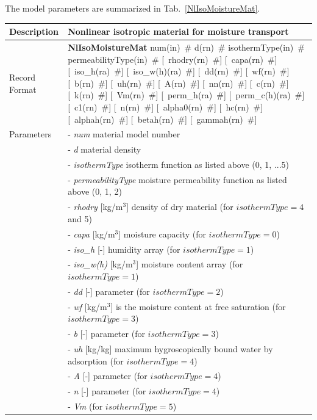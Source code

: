 \documentclass[a4paper]{article}
\newcommand{\descitem}[1]{{\noindent \bf #1}}
\newcommand{\elemparam}[2]{{{#1\tiny (#2)}~\#}}
\newcommand{\optelemparam}[2]{[{~\elemparam{#1}{#2}}]}
\newcommand{\param}[1]{{\it #1}}
\begin{document}
The model parameters are summarized in Tab.~\ref{NlIsoMoistureMat}.
\begin{table}[!htb]
\begin{tabular}{|l|p{9cm}|}
\hline
Description & Nonlinear isotropic material for moisture transport \\
\hline
Record Format & \descitem{NlIsoMoistureMat} \elemparam{num}{in}
\elemparam{d}{rn} \elemparam{isothermType}{in} \elemparam{permeabilityType}{in}
\optelemparam{rhodry}{rn} \optelemparam{capa}{rn}
\optelemparam{iso\_h}{ra} \optelemparam{iso\_w(h)}{ra}
\optelemparam{dd}{rn} \optelemparam{wf}{rn} \optelemparam{b}{rn}
\optelemparam{uh}{rn} \optelemparam{A}{rn} \optelemparam{nn}{rn}
\optelemparam{c}{rn} \optelemparam{k}{rn} \optelemparam{Vm}{rn}
\optelemparam{perm\_h}{ra} \optelemparam{perm\_c(h)}{ra}
\optelemparam{c1}{rn} \optelemparam{n}{rn} \optelemparam{alpha0}{rn}
\optelemparam{hc}{rn} \optelemparam{alphah}{rn}
\optelemparam{betah}{rn} \optelemparam{gammah}{rn} \\
Parameters &- \param{num} material model number \\
&- \param{d} material density \\
&- \param{isothermType} isotherm function as listed above (0, 1, ...5)
\\
&- \param{permeabilityType} moisture permeability function as listed
above (0, 1, 2) \\
&- \param{rhodry} [kg/m$^3$] density of dry material (for $isothermType=4$ and 5) \\
&- \param{capa} [kg/m$^3$] moisture capacity (for $isothermType=0$) \\
&- \param{iso\_h} [-] humidity array (for $isothermType=1$) \\
&- \param{iso\_w(h)} [kg/m$^3$] moisture content array (for
$isothermType=1$) \\
&- \param{dd} [-] parameter (for $isothermType=2$)\\
&- \param{wf} [kg/m$^3$] is the moisture content at free saturation
(for $isothermType=3$) \\
&- \param{b} [-] parameter (for $isothermType=3$) \\
&- \param{uh} [kg/kg] maximum hygroscopically
bound water by adsorption (for $isothermType=4$) \\
&- \param{A} [-] parameter (for $isothermType=4$) \\
&- \param{n} [-] parameter (for $isothermType=4$) \\
&- \param{Vm} (for $isothermType=5$) \\

\end{tabular}
\end{table}
\end{document}
